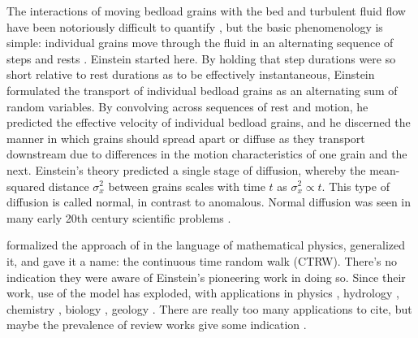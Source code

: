 \documentclass[]{agujournal2018}
\begin{document}
The interactions of moving bedload grains with the bed and turbulent fluid flow have been notoriously difficult to quantify \citep[e.g.][]{Schmeeckle2007,Gordon1972,Dwivedi2011,Celik2014}, but the basic phenomenology is simple: individual grains move through the fluid in an alternating sequence of steps and rests \citep{Einstein1937, Einstein1950,Ancey2008,Heyman2016,Hassan2017}.
Einstein started here. 
By holding that step durations were so short relative to rest durations as to be effectively instantaneous, Einstein formulated the transport of individual bedload grains as an alternating sum of random variables.
By convolving across sequences of rest and motion, he predicted the effective velocity of individual bedload grains, and he discerned the manner in which grains should spread apart or diffuse as they transport downstream due to differences in the motion characteristics of one grain and the next.
Einstein's theory predicted a single stage of diffusion, whereby the mean-squared distance $\sigma_x^2$ between grains scales with time $t$ as $\sigma_x^2 \propto t$. This type of diffusion is called normal, in contrast to anomalous. Normal diffusion was seen in many early 20th century scientific problems \citep[e.g][]{Einstein1905,Taylor1920}.

\citet{Montroll1965} formalized the approach of \citet{Einstein1937} in the language of mathematical physics, generalized it, and gave it a name: the continuous time random walk (CTRW). There's no indication they were aware of Einstein's pioneering work in doing so. Since their work, use of the model has exploded, with applications in physics \citep{Scher1973}, hydrology \citep{Rodriguez-Iturbe1987,Daly2006a}, chemistry \citep{Shugard1976}, biology \cite{Sokolov2012}, geology \citep{Berkowitz2006}.
There are really too many applications to cite, but maybe the prevalence of review works give some indication \citep[e.g.][]{Codling2008,Masoliver2017,Berkowitz2006,Kutner2017,Metzler2000,Weiss1994}.
\end{document}
